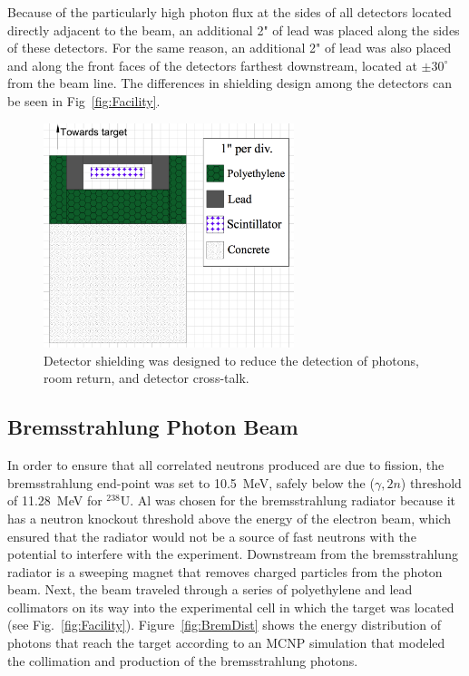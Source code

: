 Because of the particularly high photon flux at the sides of all detectors located directly adjacent to the beam, an additional 2" of lead was placed along the sides of these detectors.
For the same reason, an additional 2" of lead was also placed and along the front faces of the detectors farthest downstream, located at $\pm30^{\circ}$ from the beam line.
The differences in shielding design among the detectors can be seen in Fig~\ref{fig:Facility}.
\begin{figure}
    \centering
    \includegraphics[width = 0.65\textwidth]{Content/Methods/DetShielding.png}
    \caption{Detector shielding was designed to reduce the detection of photons, room return, and detector cross-talk.}
    \label{fig:shielding}
\end{figure}

\subsection{Bremsstrahlung Photon Beam}
\label{beam}
In order to ensure that all correlated neutrons produced are due to fission, the bremsstrahlung end-point was set to 10.5~MeV, safely below the ($\gamma, 2n$) threshold of 11.28~MeV for $^{238}$U.
Al was chosen for the bremsstrahlung radiator because it has a neutron knockout threshold above the energy of the electron beam, which ensured that the radiator would not be a source of fast neutrons with the potential to interfere with the experiment.
Downstream from the bremsstrahlung radiator is a sweeping magnet that removes charged particles from the photon beam.
Next, the beam traveled through a series of polyethylene and lead collimators on its way into the experimental cell in which the target was located (see Fig.~\ref{fig:Facility}).
Figure~\ref{fig:BremDist} shows the energy distribution of photons that reach the target according to an MCNP simulation that modeled the collimation and production of the bremsstrahlung photons.

